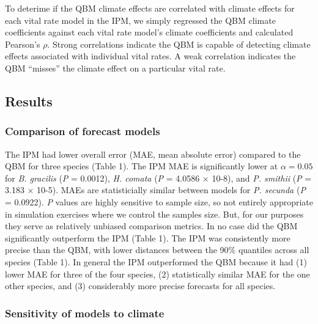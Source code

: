\documentclass[12pt,]{article}
\begin{document}
To deterime if the QBM climate effects are correlated with climate
effects for each vital rate model in the IPM, we simply regressed the
QBM climate coefficients against each vital rate model's climate
coefficients and calculated Pearson's \(\rho\). Strong correlations
indicate the QBM is capable of detecting climate effects associated with
individual vital rates. A weak correlation indicates the QBM ``misses''
the climate effect on a particular vital rate.

\subsection{Results}\label{results}

\subsubsection{Comparison of forecast
models}\label{comparison-of-forecast-models}

The IPM had lower overall error (MAE, mean absolute error) compared to
the QBM for three species (Table 1). The IPM MAE is significantly lower
at \(\alpha=0.05\) for \emph{B. gracilis} (\emph{P} = 0.0012), \emph{H.
comata} (\emph{P} = 4.0586 × 10-8), and \emph{P. smithii} (\emph{P} =
3.183 × 10-5). MAEs are statisticially similar between models for
\emph{P. secunda} (\emph{P} = 0.0922). \emph{P} values are highly
sensitive to sample size, so not entirely appropriate in simulation
exercises where we control the samples size. But, for our purposes they
serve as relatively unbiased comparison metrics. In no case did the QBM
significantly outperform the IPM (Table 1). The IPM was consistently
more precise than the QBM, with lower distances between the 90\%
quantiles across all species (Table 1). In general the IPM outperformed
the QBM because it had (1) lower MAE for three of the four species, (2)
statistically similar MAE for the one other species, and (3)
considerably more precise forecasts for all species.

\subsubsection{Sensitivity of models to
climate}\label{sensitivity-of-models-to-climate}
\end{document}
